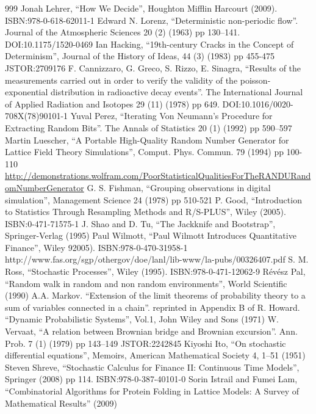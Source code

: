 \documentclass[justified, sixbynine]{tufte-book}
\theoremstyle{plain}%
\newtheorem * {corollary}{Corollary}
\theoremstyle{definition}
\theoremstyle{remark}
\newtheorem * {remark}{Remark}
\newtheorem * {note}{Note}
\begin{document}
\begin{thebibliography}{999}
 Jonah Lehrer, ``How We Decide'', Houghton Mifflin Harcourt (2009). ISBN:978-0-618-62011-1
 Edward N. Lorenz, ``Deterministic non-periodic flow''. Journal of the Atmospheric Sciences 20 (2) (1963) pp 130–141. DOI:10.1175/1520-0469
 Ian Hacking, ``19th-century Cracks in the Concept of Determinism'', Journal of the History of Ideas, 44 (3) (1983) pp 455-475 JSTOR:2709176
 F. Cannizzaro, G. Greco, S. Rizzo, E. Sinagra, ``Results of the measurements carried out in order to verify the validity of the poisson-exponential distribution in radioactive decay events''. The International Journal of Applied Radiation and Isotopes 29 (11) (1978) pp 649. DOI:10.1016/0020-708X(78)90101-1
 Yuval Perez, ``Iterating Von Neumann's Procedure for Extracting Random Bits''. The Annals of Statistics 20 (1) (1992) pp 590–597
 Martin Luescher, ``A Portable High-Quality Random Number Generator for Lattice Field Theory Simulations'', Comput. Phys. Commun. 79 (1994) pp 100-110
 \url{http://demonstrations.wolfram.com/PoorStatisticalQualitiesForTheRANDURandomNumberGenerator}
 G. S. Fishman, ``Grouping observations in digital simulation'', Management Science 24 (1978) pp 510-521
 P. Good, ``Introduction to Statistics Through Resampling Methods and R/S-PLUS'', Wiley (2005). ISBN:0-471-71575-1
 J. Shao and D. Tu, ``The Jackknife and Bootstrap'', Springer-Verlag (1995)
 Paul Wilmott, ``Paul Wilmott Introduces Quantitative Finance'', Wiley 92005). ISBN:978-0-470-31958-1
 http://www.fas.org/sgp/othergov/doe/lanl/lib-www/la-pubs/00326407.pdf
 S. M. Ross, ``Stochastic Processes'', Wiley (1995). ISBN:978-0-471-12062-9
 Révész Pal, ``Random walk in random and non random environments'', World Scientific (1990)
 A.A. Markov. ``Extension of the limit theorems of probability theory to a sum of variables connected in a chain''. reprinted in Appendix B of R. Howard. ``Dynamic Probabilistic Systems'', Vol.1, John Wiley and Sons (1971)
 W. Vervaat, ``A relation between Brownian bridge and Brownian excursion''. Ann. Prob. 7 (1) (1979) pp 143–149 JSTOR:2242845
 Kiyoshi Ito, ``On stochastic differential equations'', Memoirs, American Mathematical Society 4, 1–51 (1951)
 Steven Shreve, ``Stochastic Calculus for Finance II: Continuous Time Models'', Springer (2008) pp 114. ISBN:978-0-387-40101-0
 Sorin Istrail and Fumei Lam, ``Combinatorial Algorithms for Protein Folding in Lattice Models: A Survey of Mathematical Results'' (2009)
\end{thebibliography}
\end{document}
